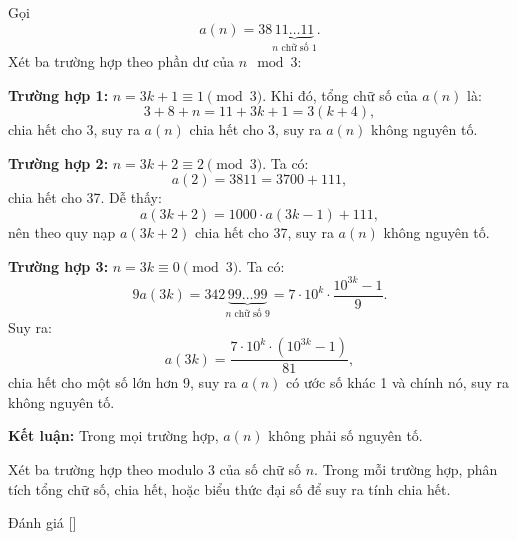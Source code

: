 \ifshowproblemandsoln
\ifshowproblem{}
\fi

\ifshowsoln
\begin{soln}\footnotemark
    Gọi
    \[
        a(n) = 38\underbrace{11\ldots11}_{n \text{ chữ số } 1}.
    \]
    Xét ba trường hợp theo phần dư của \( n \mod 3 \):

    \textbf{Trường hợp 1:} \( n = 3k + 1 \equiv 1 \pmod{3} \). Khi đó, tổng chữ số của \( a(n) \) là:
    \[
        3 + 8 + n = 11 + 3k + 1 = 3(k + 4),
    \]
    chia hết cho 3, suy ra \( a(n) \) chia hết cho 3, suy ra \( a(n) \) không nguyên tố.

    \textbf{Trường hợp 2:} \( n = 3k + 2 \equiv 2 \pmod{3} \). Ta có:
    \[
        a(2) = 3811 = 3700 + 111,
    \]
    chia hết cho 37. Dễ thấy:
    \[
        a(3k + 2) = 1000 \cdot a(3k - 1) + 111,
    \]
    nên theo quy nạp \( a(3k + 2) \) chia hết cho 37, suy ra \( a(n) \) không nguyên tố.

    \textbf{Trường hợp 3:} \( n = 3k \equiv 0 \pmod{3} \). Ta có:
    \[
        9a(3k) = 342\underbrace{99\ldots99}_{n \text{ chữ số } 9} = 7 \cdot 10^k \cdot \frac{10^{3k} - 1}{9}.
    \]
    Suy ra:
    \[
        a(3k) = \frac{7 \cdot 10^k \cdot (10^{3k} - 1)}{81},
    \]
    chia hết cho một số lớn hơn 9, suy ra \( a(n) \) có ước số khác 1 và chính nó, suy ra không nguyên tố.

    \textbf{Kết luận:} Trong mọi trường hợp, \( a(n) \) không phải số nguyên tố.
\end{soln}
\fi

\ifshowhint
\begin{hint*}
    Xét ba trường hợp theo modulo 3 của số chữ số \( n \). Trong mỗi trường hợp, phân tích tổng chữ số, chia hết, hoặc biểu thức đại số để suy ra tính chia hết.
\end{hint*}
\fi

\ifshowremark
\begin{remark*}
    Đánh giá [\textbf{}]
\end{remark*}
\newpage
\fi
